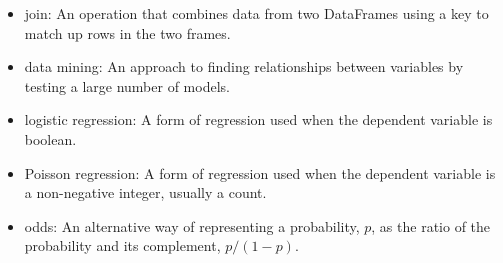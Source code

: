 \begin{itemize}
\item join: An operation that combines data from two DataFrames
using a key to match up rows in the two frames.

\item data mining: An approach to finding relationships between
variables by testing a large number of models.

\item logistic regression: A form of regression used when the
dependent variable is boolean.

\item Poisson regression: A form of regression used when the
dependent variable is a non-negative integer, usually a count.

\item odds: An alternative way of representing a probability, $p$, as
  the ratio of the probability and its complement, $p / (1-p)$.

\end{itemize}

